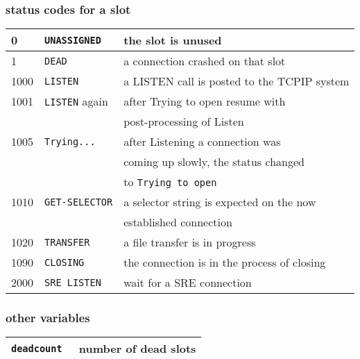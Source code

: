 \subsubsection{status codes for a slot}
\noindent\begin{tabular}{|l|l|l|}\hline
   0    & {\tt UNASSIGNED }  & the slot is unused \\
\hline
   1    & {\tt DEAD       }  & a connection crashed on that slot \\
\hline
   1000 & {\tt LISTEN     }  & a LISTEN call is posted to the TCPIP system \\
\hline
   1001 & {\tt LISTEN} again & after Trying to open resume with \\
        &                    & post-processing of Listen \\
\hline
   1005 & {\tt Trying...}    & after Listening a connection was\\
        &                    & coming up slowly, the status changed\\
        &                    & to {\tt Trying to open} \\
\hline
   1010 & {\tt GET-SELECTOR} & a selector string is expected on the now \\
        &                    & established connection \\
\hline
   1020 & {\tt TRANSFER   }  & a file transfer is in progress \\
\hline
   1090 & {\tt CLOSING    }  & the connection is in the process of closing \\
\hline
   2000 & {\tt SRE LISTEN }  & wait for a SRE connection \\
\hline\end{tabular}




\subsubsection{other variables}
\noindent\begin{tabular}{|l|l|}\hline
  {\tt  deadcount } &  number of dead slots \\
\hline\end{tabular}



